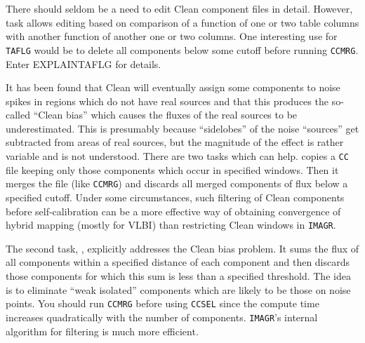      There should seldom be a need to edit Clean component files in
detail.  However, task {\tt {}} allows editing based on
comparison of a function of one or two table columns with another
function of another one or two columns.  One interesting use for {\tt
TAFLG} would be to delete all components below some cutoff before
running {\tt CCMRG}.  Enter {\us EXPLAIN\qs TAFLG \CR} for details.

     It has been found that Clean will eventually assign some
components to noise spikes in regions which do not have real sources
and that this produces the so-called ``Clean bias'' which causes the
fluxes of the real sources to be underestimated.  This is presumably
because ``sidelobes'' of the noise ``sources'' get subtracted from
areas of real sources, but the magnitude of the effect is rather
variable and is not understood.  There are two tasks which can help.
{\tt {}} copies a {\tt CC} file keeping only those
components which occur in specified windows.  Then it merges the file
(like {\tt CCMRG}) and discards all merged components of flux below a
specified cutoff.  Under some circumstances, such filtering of Clean
components before self-calibration can be a more effective way of
obtaining convergence of hybrid mapping (mostly for VLBI) than
restricting Clean windows in {\tt IMAGR}\@.

     The second task, {\tt {}}, explicitly addresses the
Clean bias problem.  It sums the flux of all components within a
specified distance of each component and then discards those
components for which this sum is less than a specified threshold.  The
idea is to eliminate ``weak isolated'' components which are likely to
be those on noise points.  You should run {\tt CCMRG} before using
{\tt CCSEL} since the compute time increases quadratically with the
number of components.  {\tt IMAGR}'s internal algorithm for filtering
is much more efficient.


